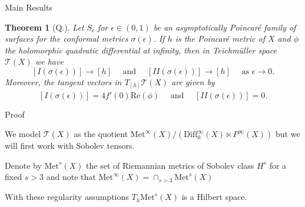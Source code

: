 \documentclass[professionalfont]{beamer}
\newtheorem*{thm*}{Theorem}
\newcommand{\two}{I\!I}
\begin{document}
%


\begin{frame}{Main Results}

\begin{thm*}[Q.]
Let $S_\epsilon$ for $\epsilon \in (0,1)$ be an asymptotically Poincar\'e family of surfaces for the conformal metrics $\sigma(\epsilon)$. 
If $h$ is the Poincar\'e metric of $X$ and $\phi$  the holomorphic quadratic differential at infinity, then in Teichm\"uller space $\mathcal{T}(X)$ we have 
\[
[I(\sigma(\epsilon))] \to [h]
\quad \text{ and } \quad
[\two(\sigma(\epsilon))] \to [h]
\quad \text{ as } \epsilon \to 0.
\]
Moreover, the tangent vectors in $T_{[h]} \mathcal{T}(X)$ are given by 
\[
\dot{[I(\sigma(\epsilon))]}  = 4 f'(0) \mathrm{Re}(\phi) \quad \text{ and } \quad \dot{[\two(\sigma(\epsilon))]} = 0.
\]
\end{thm*}

\end{frame}




\begin{frame}{Proof}

We model $\mathcal{T}(X)$ as the quotient $\mathrm{Met}^\infty(X)/(\mathrm{Diff}_0^\infty(X) \ltimes P^\infty(X))$ but we will first work with Sobolev tensors. 
\newline

Denote by $\mathrm{Met}^s(X)$ the set of Riemannian metrics of Sobolev class $H^s$ for a fixed $s > 3$ and note that $\mathrm{Met}^\infty(X) = \cap_{s > 3} \mathrm{Met}^s(X)$
\newline

With these regularity assumptions $T_h\mathrm{Met}^s(X)$ is a Hilbert space.



\end{frame}


\end{document}
